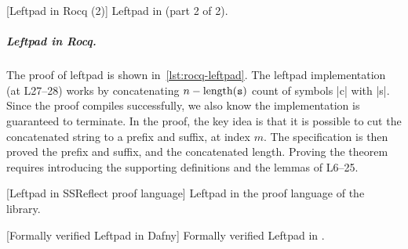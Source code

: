 \begin{center}
\captionsetup{type=lstlisting}
[Leftpad in Rocq (2)]
{Leftpad in  (part 2 of 2).}
\label{lst:rocq-leftpad2}
\end{center}

\subparagraph*{Leftpad in Rocq.}
The  proof of leftpad is shown in~\autoref{lst:rocq-leftpad}. The
leftpad implementation (at L27--28) works by concatenating \(n -
\text{length}(\prm{s})\) count of  symbols \pr|c| with \pr|s|. Since the proof
compiles successfully, we also know the implementation is guaranteed to
terminate. In the proof, the key idea is that it is possible
to cut the concatenated string to a prefix and suffix, at index \(m\). The
specification is then proved \wrt the prefix and suffix,
and the concatenated length. Proving the theorem requires introducing the
supporting definitions and the lemmas of L6--25.

\begin{center}
\captionsetup{type=lstlisting}
\begin{minipage}{\linewidth}
[Leftpad in SSReflect proof language]{
Leftpad in the  proof language of the  library.}
\label{lst:mathcomp-leftpad}
\end{minipage}
\end{center}

\begin{center}
\begin{minipage}{\linewidth}
\captionsetup{type=lstlisting}
[Formally verified Leftpad in Dafny]
{Formally verified Leftpad in .}
\label{lst:leftdfy}
\end{minipage}
\end{center}

